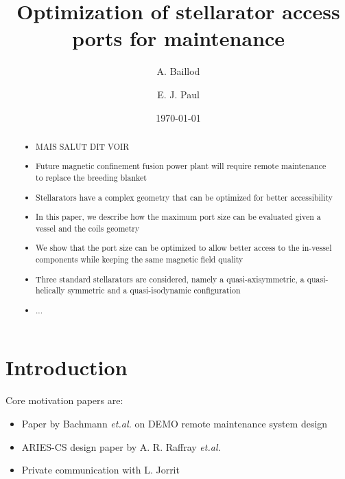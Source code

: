 \documentclass[12pt]{article}
\begin{document}
\title{Optimization of stellarator access ports for maintenance}

\author[1]{A. Baillod}
\author[1]{E. J. Paul}
\date{\today}                     %
\renewcommand\Affilfont{\itshape\small}
\maketitle


\begin{abstract}
\begin{itemize}
	\item MAIS SALUT DIT VOIR
\item Future magnetic confinement fusion power plant will require remote maintenance to replace the breeding blanket
\item Stellarators have a complex geometry that can be optimized for better accessibility
\item In this paper, we describe how the maximum port size can be evaluated given a vessel and the coils geometry
\item We show that the port size can be optimized to allow better access to the in-vessel components while keeping the same magnetic field quality
\item Three standard stellarators are considered, namely a quasi-axisymmetric, a quasi-helically symmetric and a quasi-isodynamic configuration
\item ...
\end{itemize}
\end{abstract}


\section{Introduction}

Core motivation papers are:
\begin{itemize}
    \item Paper by Bachmann \textit{et.al.} \cite{bachmann_2022} on DEMO remote maintenance system design
    \item ARIES-CS design paper \cite{raffray_2008} by A. R. Raffray \textit{et.al.}
    \item Private communication with L. Jorrit
\end{itemize}
\end{document}
